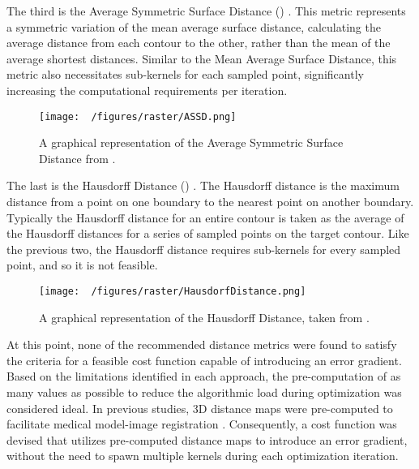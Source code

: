 The third is the Average Symmetric Surface Distance () \cite{yeghiazaryanFamilyBoundaryOverlap2018}.
This metric represents a symmetric variation of the mean average surface distance, calculating the average distance from each contour to the other, rather than the mean of the average shortest distances.
Similar to the Mean Average Surface Distance, this metric also necessitates sub-kernels for each sampled point, significantly increasing the computational requirements per iteration.

\begin{figure}[h!]
  \centering
  \texttt{[image: ~/figures/raster/ASSD.png]}
  \caption{A graphical representation of the Average Symmetric Surface Distance from \cite{reinkeUnderstandingMetricrelatedPitfalls2023,reinkeCommonLimitationsImage2023}.}
  \label{fig:ASSD}
\end{figure}

The last is the Hausdorff Distance () \cite{huttenlocherMultiresolutionTechniqueComparing1993,felzenszwalbDistanceTransformsSampled2012,huttenlocherComparingImagesUsing1993}.
The Hausdorff distance is the maximum distance from a point on one boundary to the nearest point on another boundary. Typically the Hausdorff distance for an entire contour is taken as the average of the Hausdorff distances for a series of sampled points on the target contour.
Like the previous two, the Hausdorff distance requires sub-kernels for every sampled point, and so it is not feasible.


\begin{figure}[h!]
  \centering
  \texttt{[image: ~/figures/raster/HausdorfDistance.png]}
  \caption{A graphical representation of the Hausdorff Distance, taken from \cite{reinkeCommonLimitationsImage2023,reinkeUnderstandingMetricrelatedPitfalls2023}.}
  \label{fig:HD}
\end{figure}

At this point, none of the recommended distance metrics were found to satisfy the criteria for a feasible cost function capable of introducing an error gradient.
Based on the limitations identified in each approach, the pre-computation of as many values as possible to reduce the algorithmic load during optimization was considered ideal.
In previous studies, 3D distance maps were pre-computed to facilitate medical model-image registration \cite{lavalleeRecoveringPositionOrientation1995,zuffiModelbasedMethodReconstruction1999}.
Consequently, a cost function was devised that utilizes pre-computed distance maps to introduce an error gradient, without the need to spawn multiple kernels during each optimization iteration.



